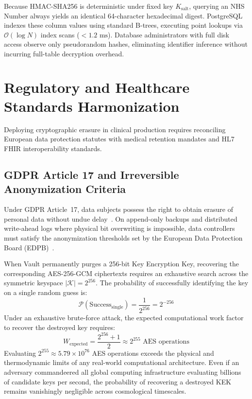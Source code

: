 Because HMAC-SHA256 is deterministic under fixed key $K_{\text{salt}}$, querying an NHS Number always yields an identical 64-character hexadecimal digest. PostgreSQL indexes these column values using standard B-trees, executing point lookups via $\mathcal{O}(\log N)$ index scans ($< 1.2\text{~ms}$). Database administrators with full disk access observe only pseudorandom hashes, eliminating identifier inference without incurring full-table decryption overhead.


\section{Regulatory and Healthcare Standards Harmonization}\label{section:regulatory-standards}

Deploying cryptographic erasure in clinical production requires reconciling European data protection statutes with medical retention mandates and HL7 FHIR interoperability standards.

\subsection{GDPR Article 17 and Irreversible Anonymization Criteria}

Under GDPR Article~17, data subjects possess the right to obtain erasure of personal data without undue delay~\cite{gdpr2016}. On append-only backups and distributed write-ahead logs where physical bit overwriting is impossible, data controllers must satisfy the anonymization thresholds set by the European Data Protection Board (EDPB)~\cite{edpb2014}. 

When Vault permanently purges a 256-bit Key Encryption Key, recovering the corresponding AES-256-GCM ciphertexts requires an exhaustive search across the symmetric keyspace $|\mathcal{K}| = 2^{256}$. The probability of successfully identifying the key on a single random guess is:
\begin{equation}
    \mathcal{P}(\text{Success}_{\text{single}}) = \frac{1}{2^{256}} = 2^{-256}
    \label{eq:brute-force-bound}
\end{equation}
Under an exhaustive brute-force attack, the expected computational work factor to recover the destroyed key requires:
\begin{equation}
    W_{\text{expected}} = \frac{2^{256} + 1}{2} \approx 2^{255} \text{ AES operations}
    \label{eq:work-factor-bound}
\end{equation}
Evaluating $2^{255} \approx 5.79 \times 10^{76}$ AES operations exceeds the physical and thermodynamic limits of any real-world computational architecture. Even if an adversary commandeered all global computing infrastructure evaluating billions of candidate keys per second, the probability of recovering a destroyed KEK remains vanishingly negligible across cosmological timescales.

